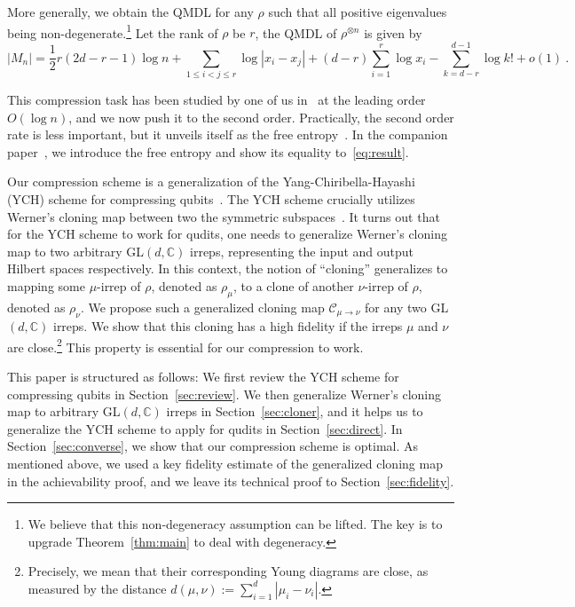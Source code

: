 \documentclass[a4paper,onecolumn,11pt]{quantumarticle}
\def\C{\mathcal{C}}
\begin{document}
More generally, we obtain the QMDL for any $\rho$ such that all positive eigenvalues being non-degenerate.\footnote{We believe that this non-degeneracy assumption can be lifted. The key is to upgrade Theorem~\ref{thm:main} to deal with degeneracy.} Let the rank of $\rho$ be $r$, the QMDL of $\rho^{\otimes n}$ is given by
\begin{equation}\label{eq:result}
        |M_n| = \frac12 r(2d-r-1)\log n + \sum_{1 \le i < j \le r}\log|x_i-x_j| + (d-r)\sum_{i=1}^r \log x_i - \sum_{k=d-r}^{d-1}\log k! + o(1) \ .
\end{equation}

This compression task has been studied by one of us in~\cite{yang2016optimal,yang2018compression} at the leading order~$O(\log n)$, and we now push it to the second order. Practically, the second order rate is less important, but it unveils itself as the free entropy~\cite{voiculescu1993analogues,voiculescu1994analogues,voiculescu2002free}. In the companion paper~\cite{paper1}, we introduce the free entropy and show its equality to~\eqref{eq:result}.

Our compression scheme is a generalization of the Yang-Chiribella-Hayashi (YCH) scheme for compressing qubits~\cite{yang2016optimal}. The YCH scheme crucially utilizes Werner's cloning map between two the symmetric subspaces~\cite{werner1998optimal}. It turns out that for the YCH scheme to work for qudits, one needs to generalize Werner's cloning map to two arbitrary GL$(d,\mathbb C)$ irreps, representing the input and output Hilbert spaces respectively. In this context, the notion of ``cloning'' generalizes to mapping some $\mu$-irrep of $\rho$, denoted as $\rho_\mu$, to a clone of another $\nu$-irrep of $\rho$, denoted as $\rho_\nu$. We propose such a generalized cloning map $\C_{\mu\to\nu}$ for any two GL$(d,\mathbb C)$ irreps. We show that this cloning has a high fidelity if the irreps $\mu$ and $\nu$ are close.\footnote{Precisely, we mean that their corresponding Young diagrams are close, as measured by the distance $d(\mu,\nu) := \sum_{i=1}^d |\mu_i-\nu_i|$.} This property is essential for our compression to work.

This paper is structured as follows: We first review the YCH scheme for compressing qubits in Section~\ref{sec:review}. We then generalize Werner's cloning map to arbitrary GL$(d,\mathbb C)$ irreps in Section~\ref{sec:cloner}, and it helps us to generalize the YCH scheme to apply for qudits in Section~\ref{sec:direct}. In Section~\ref{sec:converse}, we show that our compression scheme is optimal. As mentioned above, we used a key fidelity estimate of the generalized cloning map in the achievability proof, and we leave its technical proof to Section~\ref{sec:fidelity}. 
\end{document}
